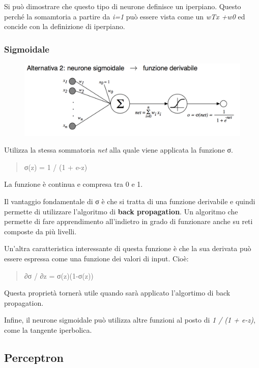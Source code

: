 Si può dimostrare che questo tipo di neurone definisce un iperpiano.
Questo perché la somamtoria a partire da \emph{i=1} può essere vista
come un \emph{wTx +w0} ed concide con la definizione di iperpiano.

\subsubsection{Sigmoidale}\label{sigmoidale}

\begin{figure}[htbp]
\centering
\includegraphics{./notes/immagini/l9-sigmoidale.png}
\caption{}
\end{figure}

Utilizza la stessa sommatoria \emph{net} alla quale viene applicata la
funzione σ.

\begin{quote}
σ(z) = 1 / (1 + e-z)
\end{quote}

La funzione è continua e compresa tra 0 e 1.

Il vantaggio fondamentale di σ è che si tratta di una funzione
derivabile e quindi permette di utilizzare l'algoritmo di \textbf{back
propagation}. Un algoritmo che permette di fare apprendimento
all'indietro in grado di funzionare anche su reti composte da più
livelli.

Un'altra caratteristica interessante di questa funzione è che la sua
derivata può essere espressa come una funzione dei valori di input.
Cioè:

\begin{quote}
∂σ / ∂z = σ(z)(1-σ(z))
\end{quote}

Questa proprietà tornerà utile quando sarà applicato l'algortimo di back
propagation.

Infine, il neurone sigmoidale può utilizza altre funzioni al posto di
\emph{1 / (1 + e-z)}, come la tangente iperbolica.

\subsection{Perceptron}\label{perceptron}

